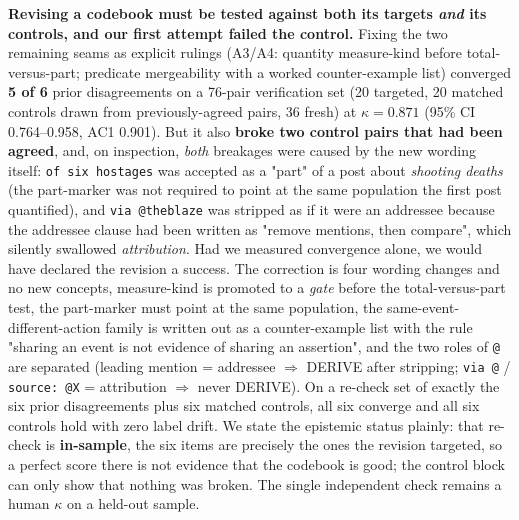 \textbf{Revising a codebook must be tested against both its targets \emph{and} its controls, and our first attempt failed the control.} Fixing the two remaining seams as explicit rulings (A3/A4: quantity measure-kind before total-versus-part; predicate mergeability with a worked counter-example list) converged \textbf{5 of 6} prior disagreements on a 76-pair verification set (20 targeted, 20 matched controls drawn from previously-agreed pairs, 36 fresh) at $\kappa=0.871$ (95\% CI 0.764--0.958, AC1 0.901). But it also \textbf{broke two control pairs that had been agreed}, and, on inspection, \emph{both} breakages were caused by the new wording itself: \texttt{of six hostages} was accepted as a "part" of a post about \emph{shooting deaths} (the part-marker was not required to point at the same population the first post quantified), and \texttt{via @theblaze} was stripped as if it were an addressee because the addressee clause had been written as "remove mentions, then compare", which silently swallowed \emph{attribution}. Had we measured convergence alone, we would have declared the revision a success. The correction is four wording changes and no new concepts, measure-kind is promoted to a \emph{gate} before the total-versus-part test, the part-marker must point at the same population, the same-event-different-action family is written out as a counter-example list with the rule "sharing an event is not evidence of sharing an assertion", and the two roles of \texttt{@} are separated (leading mention = addressee $\Rightarrow$ DERIVE after stripping; \texttt{via @} / \texttt{source: @X} = attribution $\Rightarrow$ never DERIVE). On a re-check set of exactly the six prior disagreements plus six matched controls, all six converge and all six controls hold with zero label drift. We state the epistemic status plainly: that re-check is \textbf{in-sample}, the six items are precisely the ones the revision targeted, so a perfect score there is not evidence that the codebook is good; the control block can only show that nothing was broken. The single independent check remains a human $\kappa$ on a held-out sample.
